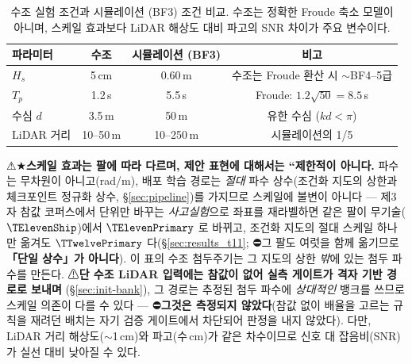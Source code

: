 \documentclass[11pt]{report}
\numberwithin{equation}{chapter}
\numberwithin{figure}{chapter}
\numberwithin{table}{chapter}
\begin{document}
\begin{table}[H]
\centering
\caption{수조 실험 조건과 시뮬레이션 (BF3) 조건 비교.
수조는 정확한 Froude 축소 모델이 아니며, 스케일 효과보다
LiDAR 해상도 대비 파고의 SNR 차이가 주요 변수이다.}
\label{tab:tank_scaling}
\begin{tabular}{lccc}
\toprule
파라미터 & 수조 & 시뮬레이션 (BF3) & 비고 \\
\midrule
$H_s$ & 5\,cm & 0.60\,m & 수조는 Froude 환산 시 $\sim$BF4--5급 \\
$T_p$ & 1.2\,s & 5.5\,s & Froude: $1.2\sqrt{50}=8.5$\,s \\
수심 $d$ & 3.5\,m & 50\,m & 유한 수심 ($kd<\pi$) \\
LiDAR 거리 & 10--50\,m & 10--250\,m & 시뮬레이션의 1/5 \\
\bottomrule
\end{tabular}
\end{table}

⚠★\textbf{스케일 효과는 팔에 따라 다르며, 제안 표현에 대해서는 ``제한적이 아니다.}
파수는 무차원이 아니고(rad/m), 배포 학습 경로는 \emph{절대} 파수 상수(조건화 지도의
상한과 체크포인트 정규화 상수, \S\ref{sec:pipeline})를 가지므로 스케일에 불변이 아니다
--- 제3자 참값 코퍼스에서 단위만 바꾸는 \emph{사고실험}으로 좌표를 재라벨하면 같은 팔이
무기술($\TElevenShip$)에서 $\TElevenPrimary$ 로 바뀌고, 조건화 지도의 절대 스케일 하나만
옮겨도 $\TTwelvePrimary$ 다(\S\ref{sec:results_t11}; ⛔그 팔도 여럿을 함께 옮기므로
\textbf{「단일 상수」가 아니다}). 이 표의 수조 첨두주기는 그 지도의
상한 \emph{밖}에 있는 첨두 파수를 만든다.
⚠\textbf{단 수조 LiDAR 입력에는 참값이 없어 실측 게이트가 격자 기반 경로로 보내며}
(\S\ref{sec:init-bank}), 그 경로는 추정된 첨두 파수에 \emph{상대적인} 뱅크를 쓰므로 스케일
의존이 다를 수 있다 --- ⛔\textbf{그것은 측정되지 않았다}(참값 없이 배율을 고르는 규칙을
재려던 배치는 자기 검증 게이트에서 차단되어 판정을 내지 않았다).
다만, LiDAR 거리 해상도($\sim$1\,cm)와 파고(수\,cm)가 같은 차수이므로
신호 대 잡음비(SNR)가 실선 대비 낮아질 수 있다.
\end{document}
